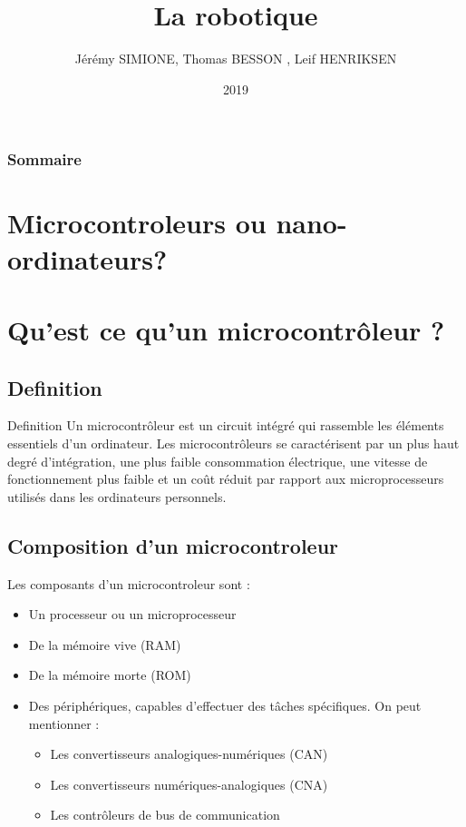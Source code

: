 \documentclass{beamer}
\title{La robotique}
\author{Jérémy SIMIONE, Thomas BESSON , Leif HENRIKSEN}
\institute{Université de Montpellier}
\date{2019}
\begin{document}
\begin{frame}
  \titlepage
\end{frame}

\begin{frame}
  \frametitle{Sommaire}
  {\small \tableofcontents[hideallsubsections]}
\end{frame}

\section{Microcontroleurs ou nano-ordinateurs?}
\section{Qu'est ce qu'un microcontrôleur ?}

\subsection{Definition}
\begin{frame}
\begin{block}{Definition}
Un microcontrôleur est un circuit intégré qui rassemble les éléments essentiels d'un ordinateur.
 Les microcontrôleurs se caractérisent par un plus haut degré d'intégration, une plus faible consommation électrique,
 une vitesse de fonctionnement plus faible  et un coût réduit par rapport aux microprocesseurs  utilisés dans les ordinateurs personnels. 
\end{block}
\end{frame}
\subsection{Composition d'un microcontroleur}
\begin{frame}
  Les composants d'un  microcontroleur sont  :
  \begin{itemize}
      \item Un processeur ou un microprocesseur 
      \item De la mémoire vive (RAM) 
      \item De la mémoire morte (ROM) 	
      \item Des périphériques, capables d'effectuer des tâches spécifiques. On peut mentionner  :
		\begin{itemize}
   			\item Les convertisseurs analogiques-numériques (CAN) 
 			  \item Les convertisseurs numériques-analogiques (CNA) 
 			  \item Les contrôleurs de bus de communication
		\end{itemize} 
  \end{itemize}
\end{frame}
\end{document}
